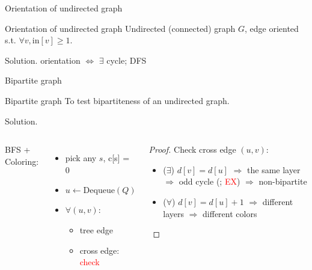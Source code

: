 \begin{frame}{Orientation of undirected graph}
  \begin{exampleblock}{Orientation of undirected graph }
    Undirected (connected) graph $G$, edge oriented s.t. $\forall v, \text{in}[v] \ge 1$.
  \end{exampleblock}

  \begin{block}{Solution.}
    orientation $\iff$ $\exists$ cycle; DFS
  \end{block}
\end{frame}
\begin{frame}{Bipartite graph}
  \begin{exampleblock}{Bipartite graph }
    To test bipartiteness of an undirected graph.
  \end{exampleblock}

  \begin{block}{Solution.}
    \begin{columns}
        BFS + Coloring:
	\begin{itemize}
	  \item pick any $s$, c[s] = 0
	  \item $u \gets \text{Dequeue}(Q)$
	  \item $\forall (u,v)$: 
	    \begin{itemize}
	      \item tree edge
	      \item cross edge: \textcolor{red}{check}
	    \end{itemize}
	\end{itemize}
	\begin{proof}
	  Check cross edge $(u,v)$:
	  \begin{itemize}
	    \item ($\exists$) $d[v] = d[u]$ $\Rightarrow$ the same layer $\Rightarrow$ odd cycle (; \textcolor{red}{EX}) $\Rightarrow$ non-bipartite
	    \item ($\forall$) $d[v] = d[u] + 1$ $\Rightarrow$ different layers $\Rightarrow$ different colors
	  \end{itemize}
	\end{proof}
    \end{columns}
  \end{block}
\end{frame}
